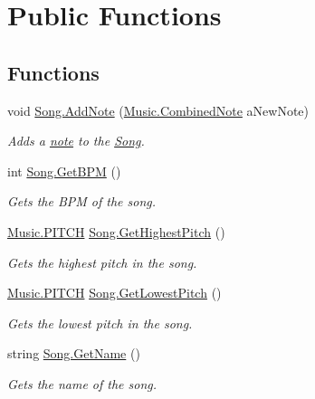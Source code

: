 \hypertarget{group___song_pub_func}{}\section{Public Functions}
\label{group___song_pub_func}
\subsection*{Functions}
\begin{DoxyCompactItemize}
\item 
void \hyperlink{group___song_pub_func_gab7c8fe4dc29f5ae7b7728c583fe51f7e}{Song.\+Add\+Note} (\hyperlink{group___music_structs_struct_music_1_1_combined_note}{Music.\+Combined\+Note} a\+New\+Note)
\begin{DoxyCompactList}\small\item\em Adds a \hyperlink{group___music_structs_struct_music_1_1_combined_note}{note} to the \hyperlink{class_song}{Song}. \end{DoxyCompactList}\item 
int \hyperlink{group___song_pub_func_gaaaf3d27d474713d7d368e3fd4c570be0}{Song.\+Get\+B\+PM} ()
\begin{DoxyCompactList}\small\item\em Gets the B\+PM of the song. \end{DoxyCompactList}\item 
\hyperlink{group___music_enums_ga508f69b199ea518f935486c990edac1d}{Music.\+P\+I\+T\+CH} \hyperlink{group___song_pub_func_gafaa104e8653edf64148260ecd400570f}{Song.\+Get\+Highest\+Pitch} ()
\begin{DoxyCompactList}\small\item\em Gets the highest pitch in the song. \end{DoxyCompactList}\item 
\hyperlink{group___music_enums_ga508f69b199ea518f935486c990edac1d}{Music.\+P\+I\+T\+CH} \hyperlink{group___song_pub_func_gae4e71c8eb059cc9cf0b77e78971ab326}{Song.\+Get\+Lowest\+Pitch} ()
\begin{DoxyCompactList}\small\item\em Gets the lowest pitch in the song. \end{DoxyCompactList}\item 
string \hyperlink{group___song_pub_func_ga705c433f2bfb5aede337698144b23c8b}{Song.\+Get\+Name} ()
\begin{DoxyCompactList}\small\item\em Gets the name of the song. \end{DoxyCompactList}\item 

\end{DoxyCompactItemize}
